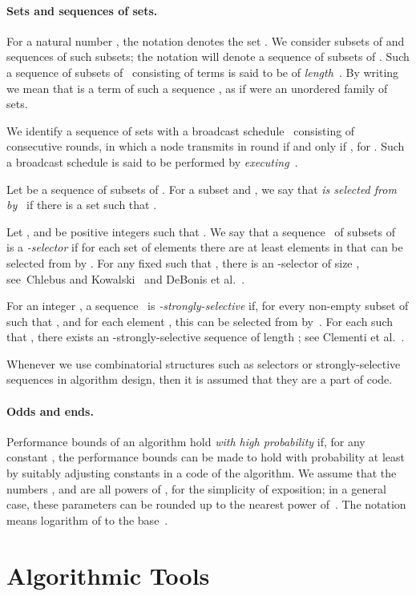 \documentclass[11pt]{article}
\newcommand{\BBB}{\vspace*{-\bigskipamount}}
\newcommand{\Paragraph}[1]{\BBB\paragraph{#1}}
\begin{document}
\Paragraph{Sets and sequences of sets.}


For a natural number , the notation  denotes the set .
We consider subsets of  and sequences of such subsets; the notation  will denote a sequence of subsets of . 
Such a sequence  of subsets of~ consisting of  terms is said to be of \emph{length~}. 
By writing  we mean that  is a term of such a sequence , as if  were an unordered family of sets.

We identify a sequence of sets  with a broadcast schedule~ consisting of  consecutive rounds, in which a node  transmits in round  if and only if  , for .
Such a broadcast schedule is said to be performed by \emph{executing~}.


Let  be a sequence of subsets of . 
For a subset  and , we say that \emph{ is selected from~ by~} if there is a set  such that .



Let ,  and  be positive integers such that . 
We say that a sequence~ of subsets of~ is a \emph{-selector} if for each set  of  elements  there are at least  elements in  that can be selected from  by . 
For any fixed  such that , there is an -selector of   size , see~Chlebus and Kowalski~\cite{ChlebusK05} and DeBonis et al.~\cite{DeBonisGV05}.




For an integer , a sequence~ is \emph{-strongly-selective} if, for every non-empty subset  of  such that , and for each element , this  can be selected from  by~. 
For each  such that , there exists an -strongly-selective sequence of length ; 
see Clementi et al.~\cite{ClementiMS01}.

Whenever we use combinatorial structures such as selectors or strongly-selective sequences in algorithm design, then it is assumed that they are a part of code.



\Paragraph{Odds and ends.}



Performance bounds of an algorithm hold \emph{with high probability} if, for any constant , the performance bounds can be made to hold with  probability at least  by suitably adjusting constants in a code of the algorithm.
We assume that the numbers ,  and  are all powers of , for the simplicity of exposition; in a general case, these parameters can be rounded up to the nearest power of~.
 The notation  means logarithm of  to the base~.



\section{Algorithmic Tools}
\end{document}
